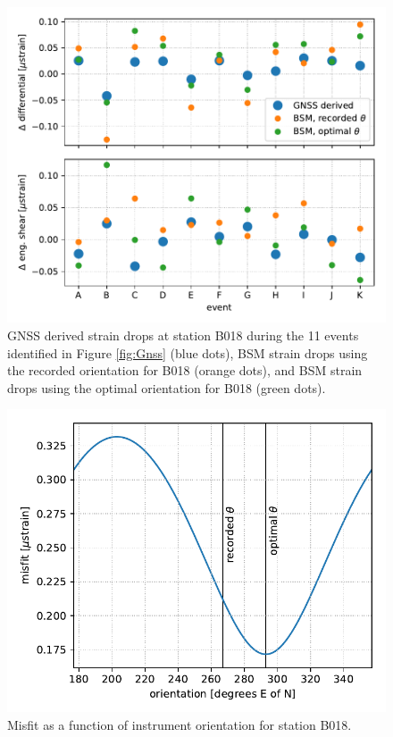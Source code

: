 \documentclass[10pt,a4paper]{article}
\begin{document}
\begin{figure}
\includegraphics{figures/fit.pdf}
\caption{GNSS derived strain drops at station B018 during the 11 events identified in Figure \ref{fig:Gnss} (blue dots), BSM strain drops using the recorded orientation for B018 (orange dots), and BSM strain drops using the optimal orientation for B018 (green dots).}   
\label{fig:Fit}
\end{figure}

\begin{figure}
\includegraphics{figures/misfit.pdf}
\caption{Misfit as a function of instrument orientation for station B018.}   
\label{fig:Misfit}
\end{figure}
\end{document}
